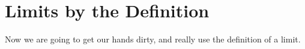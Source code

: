 \begin{exercises}
\end{exercises}















\section{Limits by the Definition}


Now we are going to get our hands dirty, and really use the definition
of a limit.

